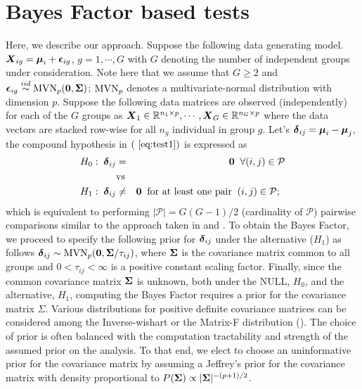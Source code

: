 \documentclass[times,sort&compress,3p]{elsarticle}
\theoremstyle{plain}%
\theoremstyle{definition}
\def\bzero{{\mathbf 0}}
\newcommand{\uzero}            {\mbox{\boldmath$0$}}
\def\MVN{\hbox{MVN}}
\def\be{\begin{eqnarray}}
\def\ee{\end{eqnarray}}
\def\bzero{{\mathbf 0}}
\newcommand{\uS}       {\mbox{\boldmath$S$}}
\newcommand{\uX}       {\mbox{\boldmath$X$}}
\newcommand{\udelta}            {\mbox{\boldmath$\delta$}}
\newcommand{\uepsilon}          {\mbox{\boldmath$\epsilon$}}
\newcommand{\umu}               {\mbox{\boldmath$\mu$}}
\newcommand{\uSigma}            {\mbox{\boldmath$\Sigma$}}
\begin{document}

\section{Bayes Factor based tests} \label{sec:test}
Here, we describe our approach. Suppose the following data generating model. $\uX_{ig} = \umu_i + \uepsilon_{ig}$, $g = 1, \cdots, G$ with $G$ denoting the number of independent groups under consideration.
Note here that we assume that $G \geq 2$ and $\uepsilon_{ig} \stackrel{iid}{\sim} \MVN_{p}(\bzero, \uSigma)$; $\MVN_{p}$ denotes a multivariate-normal distribution with dimension $p$. Suppose the following data matrices are observed (independently) for each of the $G$ groups as $\uX_1 \in \mathbb{R}^{n_1 \times p}, \cdots,  \uX_G \in \mathbb{R}^{n_G \times p}$ where the data vectors are stacked row-wise for all $n_g$ individual in group $g$. 
Let's $\udelta_{ij} = \umu_i - \umu_j$, the compound hypothesis in $(~\ref{eq:test1})$ is expressed as
\be
H_0:\; \udelta_{ij} &=& \uzero\;\;\forall (i,j) \in \mathcal{P} \nonumber \\
 &\mbox{vs}& \nonumber \\
 H_1: \; \udelta_{ij}  &\neq & \uzero\;\;\mbox{for at least one pair}\;\;(i,j) \in \mathcal{P};\;\; \label{eq:hyp1} 
\ee
which is equivalent to performing $|\mathcal{P}| = G(G-1)/2$ (cardinality of $\mathcal{P}$) pairwise comparisons similar to the approach taken in \cite{tony2014two} and \cite{ahmad2014u}. To obtain the Bayes Factor, we proceed to specify the following prior for $\udelta_{ij}$ under the alternative ($H_1$) as follows $\udelta_{ij} \sim \MVN_{p}(\uzero, \uSigma/\tau_{ij})$, where $\uSigma$ is the covariance matrix common to all groups and $ 0 < \tau_{ij} < \infty$ is a positive constant scaling factor. Finally, since the common covariance matrix $\uSigma$ is unknown, both under the NULL, $H_0$, and the alternative, $H_1$, computing the Bayes Factor requires a prior for the covariance matrix $\Sigma$. Various distributions for positive definite covariance matrices can be considered among the Inverse-wishart or the Matrix-F distribution (\cite{mulder2018matrix}). The choice of prior is often balanced with the computation tractability and strength of the assumed prior on the analysis. To that end, we elect to choose an uninformative prior for the covariance matrix by assuming a Jeffrey's prior for the covariance matrix with density proportional to \textcolor{red}{$P(\uSigma) \propto |\uSigma|^{-(p+1)/2}$}. 
\end{document}
